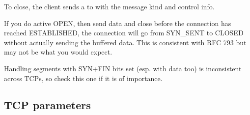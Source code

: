 To close, the client sends a  to 
with the  message kind and 
control info.

\begin{note}
If you do active OPEN, then send data and close before the connection
has reached ESTABLISHED, the connection will go from SYN\_SENT to CLOSED
without actually sending the buffered data. This is consistent with
RFC 793 but may not be what you would expect.
\end{note}

\begin{note}
Handling segments with SYN+FIN bits set (esp. with data too) is
inconsistent across TCPs, so check this one if it is of importance.
\end{note}


\subsection{TCP parameters}

